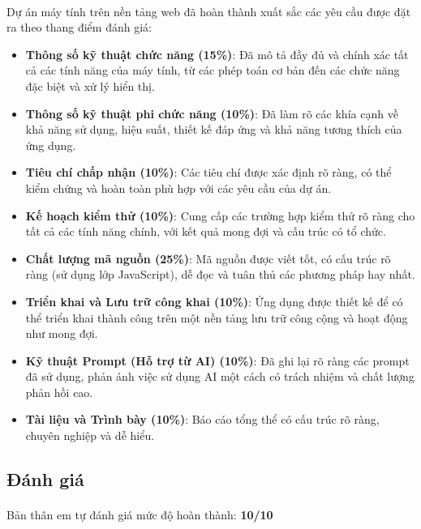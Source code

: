 \documentclass{article}
\begin{document}
\paragraph{}{Dự án máy tính trên nền tảng web đã hoàn thành xuất sắc các yêu cầu được đặt ra theo thang điểm đánh giá:}
\begin{itemize}
    \item \textbf{Thông số kỹ thuật chức năng (15\%)}: Đã mô tả đầy đủ và chính xác tất cả các tính năng của máy tính, từ các phép toán cơ bản đến các chức năng đặc biệt và xử lý hiển thị.
    \item \textbf{Thông số kỹ thuật phi chức năng (10\%)}: Đã làm rõ các khía cạnh về khả năng sử dụng, hiệu suất, thiết kế đáp ứng và khả năng tương thích của ứng dụng.
    \item \textbf{Tiêu chí chấp nhận (10\%)}: Các tiêu chí được xác định rõ ràng, có thể kiểm chứng và hoàn toàn phù hợp với các yêu cầu của dự án.
    \item \textbf{Kế hoạch kiểm thử (10\%)}: Cung cấp các trường hợp kiểm thử rõ ràng cho tất cả các tính năng chính, với kết quả mong đợi và cấu trúc có tổ chức.
    \item \textbf{Chất lượng mã nguồn (25\%)}: Mã nguồn được viết tốt, có cấu trúc rõ ràng (sử dụng lớp JavaScript), dễ đọc và tuân thủ các phương pháp hay nhất.
    \item \textbf{Triển khai và Lưu trữ công khai (10\%)}: Ứng dụng được thiết kế để có thể triển khai thành công trên một nền tảng lưu trữ công cộng và hoạt động như mong đợi.
    \item \textbf{Kỹ thuật Prompt (Hỗ trợ từ AI) (10\%)}: Đã ghi lại rõ ràng các prompt đã sử dụng, phản ánh việc sử dụng AI một cách có trách nhiệm và chất lượng phản hồi cao.
    \item \textbf{Tài liệu và Trình bày (10\%)}: Báo cáo tổng thể có cấu trúc rõ ràng, chuyên nghiệp và dễ hiểu.
\end{itemize}

\subsection{Đánh giá}

\paragraph{}{Bản thân em tự đánh giá mức độ hoàn thành: \textbf{10/10}}
\end{document}
